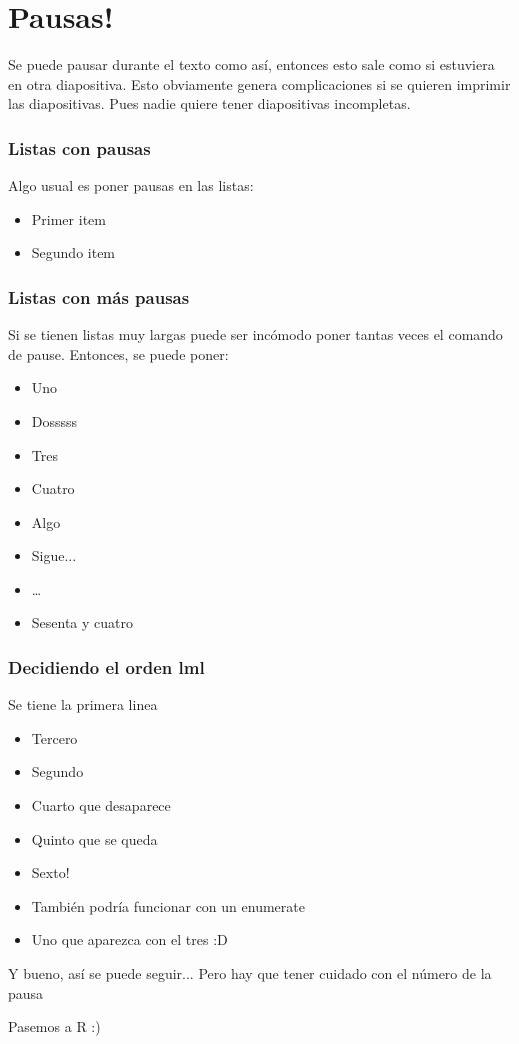 \documentclass{beamer}
\begin{document}
\section{Pausas!}
\begin{frame}
Se puede pausar durante el texto \pause como as\'i, entonces esto sale como si estuviera en otra diapositiva. \pause Esto obviamente genera complicaciones si se quieren imprimir las diapositivas. \pause Pues nadie quiere tener diapositivas incompletas.
\end{frame}


\begin{frame}
\frametitle{Listas con pausas}
Algo usual es poner pausas en las listas:\pause
\begin{itemize}
\item Primer item\pause
\item Segundo item\pause
\end{itemize}
\end{frame}

\begin{frame}
\frametitle{Listas con m\'as pausas}
Si se tienen listas muy largas puede ser inc\'omodo poner tantas veces el comando de pause. Entonces, se puede poner:
\begin{itemize}[<+->]
	\item Uno
	\item Dosssss
	\item Tres
	\item Cuatro
	\item Algo
	\item Sigue...
	\item \dots
	\item Sesenta y cuatro
\end{itemize}
\end{frame}

\begin{frame}
\frametitle{Decidiendo el orden lml}
Se tiene la primera linea
\begin{itemize}
\item<3-> Tercero
\item<2-> Segundo
\item<4> Cuarto que desaparece
\item<5-> Quinto que se queda
\item<6-> Sexto!
\item Tambi\'en podr\'ia funcionar con un enumerate
\item<3-> Uno que aparezca con el tres :D
\end{itemize}

\pause[7] Y bueno, as\'i se puede seguir... \pause[4] Pero hay que tener cuidado con el n\'umero de la pausa
\end{frame}

\begin{frame}{}

{\Large Pasemos a R :)}

\end{frame}
\end{document}
